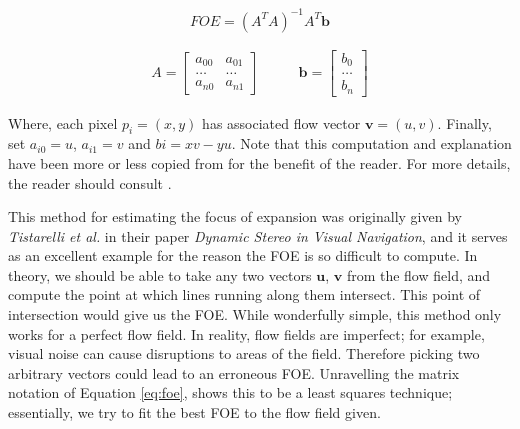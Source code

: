 \documentclass[a4paper,11pt,twoside,openright]{article}
\begin{document}
\begin{equation}
  \label{eq:foe}
  FOE = (A^TA)^{-1}A^T\mathbf{b}
\end{equation}

\begin{equation*}
  \begin{split}
 A = 
\begin{bmatrix}
  a_{00} & a_{01}\\
  \dots  & \dots \\
  a_{n0} &  a_{n1}
\end{bmatrix}
\qquad
\end{split}
\begin{split}
\mathbf{b} =
\begin{bmatrix}
  b_0 \\
  \dots \\
  b_n
\end{bmatrix}
\end{split}
\end{equation*}
\newline

Where, each pixel $p_i = (x, y)$ has associated flow vector $\mathbf{v} = (u,v)$.
Finally, set $a_{i0} = u$, $a_{i1} = v$ and $b{i} = xv - yu$. Note that this
computation and explanation have been more or less copied from
\cite{Mitchell2018} for the benefit of the reader. For more details, the reader
should consult \cite{ODonovan2005}.
\newline
\par

This method for estimating the focus of expansion was originally given by
\textit{Tistarelli et al.} in their paper
\textit{Dynamic Stereo in Visual Navigation}\cite{Tistarelli1991, ODonovan2005},
and it serves as an excellent example for the reason the FOE is so difficult to
compute. In theory, we should be able to take any two vectors $\mathbf{u}$,
$\mathbf{v}$ from the flow field, and compute the point at which lines
running along them intersect. This point of intersection would give us the
FOE\cite{ODonovan2005}. While wonderfully simple, this method only works for
a perfect flow field. In reality, flow fields are imperfect; for example,
visual noise can cause disruptions to areas of the field. Therefore picking two
arbitrary vectors could lead to an erroneous FOE. Unravelling the matrix notation
of Equation \ref{eq:foe}, shows this to be a least squares technique;
essentially, we try to fit the best FOE to the flow field given.

\end{document}
